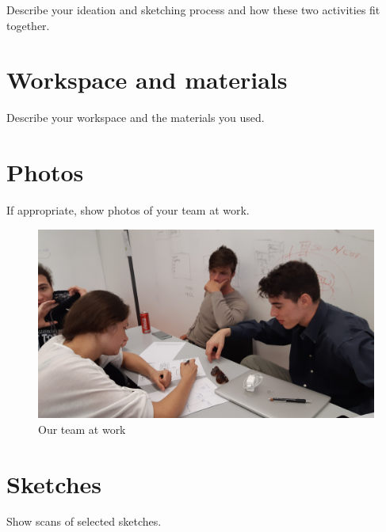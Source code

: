 \documentclass[12pt]{scrartcl}
\begin{document}
	Describe your ideation and sketching process and how these two activities fit together.
	

\section{Workspace and materials}

	Describe your workspace and the materials you used.
	
	
\section{Photos}

	If appropriate, show photos of your team at work.
	
	
	\begin{figure}[H]
        		\centering
       		\includegraphics[width=\textwidth]{../images/group2.jpg}
       		\caption{Our team at work}
        		\label{group2}
	\end{figure}
	
	
\section{Sketches}
	
	Show scans of selected sketches.
	
\end{document}
